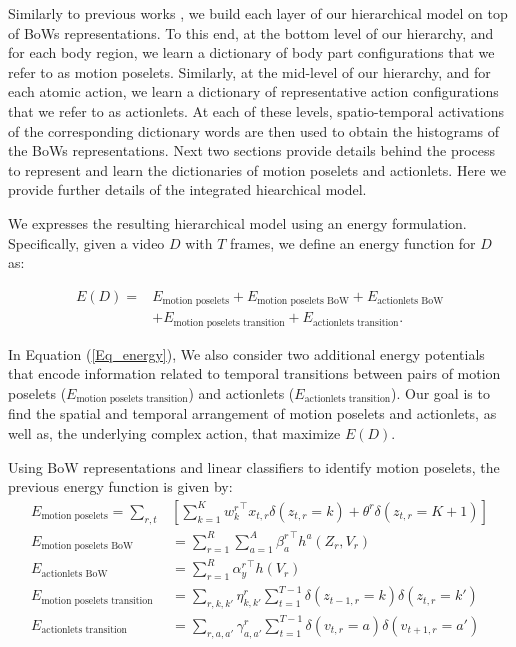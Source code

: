 Similarly to previous works \cite{Lillo2014, Taralova:EtAl:2014}, we build 
each layer of our hierarchical model on top of BoWs 
representations. To this end, at the bottom level of our hierarchy, and for 
each body region, we learn a dictionary of body part configurations that we 
refer to as motion poselets. Similarly, at the mid-level of our hierarchy, and 
for each atomic action, we learn a dictionary of representative action 
configurations that we refer to as actionlets. At each of these levels, 
spatio-temporal activations of the corresponding dictionary words are then used 
to obtain the histograms of the BoWs representations. Next two sections provide 
details behind the process to represent and learn the dictionaries of motion 
poselets and actionlets. Here we provide further details of the 
integrated hiearchical model.

We expresses the resulting hierarchical model using an energy formulation. 
Specifically, given a video $D$ with $T$ frames, we
define an energy function for $D$ as:

\begin{align}\label{Eq_energy}
E(D) = & E_{\text{motion poselets}} + E_{\text{motion poselets BoW}} + 
E_{\text{actionlets BoW}} \nonumber \\ 
& + E_{\text{motion poselets transition}} + E_{\text{actionlets 
transition}}.
\end{align}

In Equation (\ref{Eq_energy}), We 
also 
consider two additional energy potentials that encode information related to 
temporal 
transitions between pairs of motion poselets ($E_{\text{motion poselets 
transition}}$) and 
actionlets ($E_{\text{actionlets transition}}$). Our goal is to find the 
spatial and temporal arrangement 
of motion poselets and actionlets, as well as, the underlying 
complex action, that maximize $E(D)$. 

Using BoW representations and linear classifiers to identify motion poselets, 
the previous energy function is given by:
{\small
\begin{align}
E_{\text{motion poselets}}  =  \sum_{r,t} & \left[ \sum_{k=1}^K {w^r_k}^\top 
x_{t,r}\delta(z_{t,r} = k) + 
\theta^r \delta(z_{t,r}=K+1)\right] \\
E_{\text{motion poselets BoW}} & = \sum_{r=1}^R \sum_{a=1}^A {\beta^r_{a}}^\top 
h^{a}(Z_r,V_r) \\
E_{\text{actionlets BoW}} &=\sum_{r=1}^R {\alpha^r_{y}}^\top h(V_r) \\
E_{\text{motion poselets transition}} & = \sum_{r,k,k'} \eta^r_{k,k'} 
\sum_{t=1}^{T-1} 
\delta(z_{t-1,r}=k)\delta(z_{t,r}=k')\\
E_{\text{actionlets transition}} & =\sum_{r, a,a'} \gamma^r_{a,a'} 
\sum_{t=1}^{T-1} 
\delta(v_{t,r}=a)\delta(v_{t+1,r}=a') 
\end{align}
}


